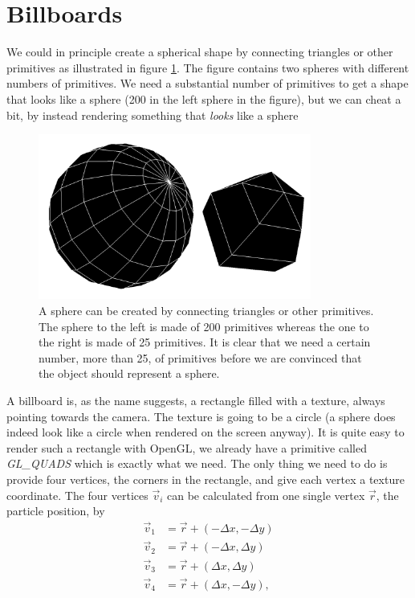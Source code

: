 \section{Billboards}
\label{sec:vis_billboards}
We could in principle create a spherical shape by connecting triangles or other primitives as illustrated in figure \ref{fig:visualization_glut_spheres}. The figure contains two spheres with different numbers of primitives. We need a substantial number of primitives to get a shape that looks like a sphere (200 in the left sphere in the figure), but we can cheat a bit, by instead rendering something that \textit{looks} like a sphere
\begin{figure}[h]
\begin{center}
\includegraphics[width=0.8\textwidth, trim=0cm 0cm 0cm 0cm, clip]{visualization/figures/glut_spheres.png}
\end{center}
\caption{A sphere can be created by connecting triangles or other primitives. The sphere to the left is made of 200 primitives whereas the one to the right is made of 25 primitives. It is clear that we need a certain number, more than 25, of primitives before we are convinced that the object should represent a sphere.}
\label{fig:visualization_glut_spheres}
\end{figure}
A billboard is, as the name suggests, a rectangle filled with a texture, always pointing towards the camera. The texture is going to be a circle (a sphere does indeed look like a circle when rendered on the screen anyway). It is quite easy to render such a rectangle with OpenGL, we already have a primitive called \textit{GL\_QUADS} which is exactly what we need. The only thing we need to do is provide four vertices, the corners in the rectangle, and give each vertex a texture coordinate. The four vertices $\vec v_i$ can be calculated from one single vertex $\vec r$, the particle position, by
\begin{align}
	\label{eq:vis_vertices_billboard}
	\vec v_1 &= \vec r + (-\Delta x, -\Delta y)\\
	\nonumber
	\vec v_2 &= \vec r + (-\Delta x, \Delta y)\\
	\nonumber
	\vec v_3 &= \vec r + (\Delta x, \Delta y)\\
	\nonumber
	\vec v_4 &= \vec r + (\Delta x, -\Delta y),
\end{align}

